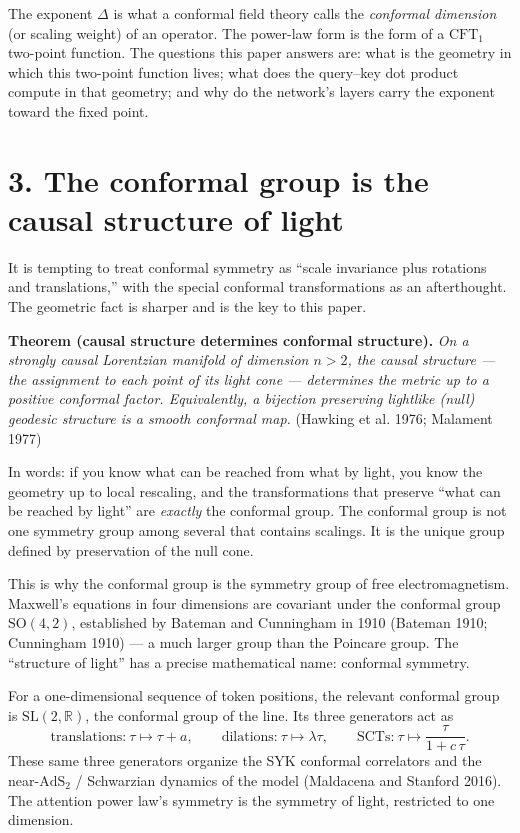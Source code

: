 The exponent \(\Delta\) is what a conformal field theory calls the
\emph{conformal dimension} (or scaling weight) of an operator. The
power-law form is the form of a \(\mathrm{CFT}_1\) two-point function.
The questions this paper answers are: what is the geometry in which this
two-point function lives; what does the query--key dot product compute
in that geometry; and why do the network's layers carry the exponent
toward the fixed point.

\section{3. The conformal group is the causal structure of
light}\label{the-conformal-group-is-the-causal-structure-of-light}

It is tempting to treat conformal symmetry as ``scale invariance plus
rotations and translations,'' with the special conformal transformations
as an afterthought. The geometric fact is sharper and is the key to this
paper.

\textbf{Theorem (causal structure determines conformal structure).}
\emph{On a strongly causal Lorentzian manifold of dimension \(n > 2\),
the causal structure --- the assignment to each point of its light cone
--- determines the metric up to a positive conformal factor.
Equivalently, a bijection preserving lightlike (null) geodesic structure
is a smooth conformal map.} (Hawking et al. 1976; Malament 1977)

In words: if you know what can be reached from what by light, you know
the geometry up to local rescaling, and the transformations that
preserve ``what can be reached by light'' are \emph{exactly} the
conformal group. The conformal group is not one symmetry group among
several that contains scalings. It is the unique group defined by
preservation of the null cone.

This is why the conformal group is the symmetry group of free
electromagnetism. Maxwell's equations in four dimensions are covariant
under the conformal group \(\mathrm{SO}(4,2)\), established by Bateman
and Cunningham in 1910 (Bateman 1910; Cunningham 1910) --- a much larger
group than the Poincar\textquotesingle e group. The ``structure of
light'' has a precise mathematical name: conformal symmetry.

For a one-dimensional sequence of token positions, the relevant
conformal group is \(\mathrm{SL}(2,\mathbb{R})\), the conformal group of
the line. Its three generators act as \[
\text{translations:}\ \tau \mapsto \tau + a, \qquad
\text{dilations:}\ \tau \mapsto \lambda\tau, \qquad
\text{SCTs:}\ \tau \mapsto \frac{\tau}{1 + c\,\tau}.
\] These same three generators organize the SYK conformal correlators
and the near-\(\mathrm{AdS}_2\) / Schwarzian dynamics of the model
(Maldacena and Stanford 2016). The attention power law's symmetry is the
symmetry of light, restricted to one dimension.

